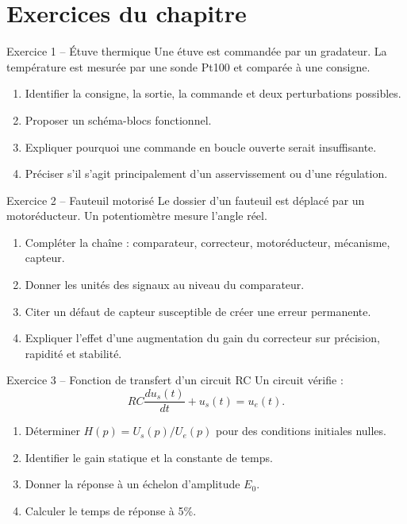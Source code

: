
\section{Exercices du chapitre}\label{sec:sa-exercices}

\begin{TLExercise}{Exercice 1 -- Étuve thermique}
Une étuve est commandée par un gradateur. La température est mesurée par une sonde Pt100 et comparée à une consigne.
\begin{enumerate}
  \item Identifier la consigne, la sortie, la commande et deux perturbations possibles.
  \item Proposer un schéma-blocs fonctionnel.
  \item Expliquer pourquoi une commande en boucle ouverte serait insuffisante.
  \item Préciser s'il s'agit principalement d'un asservissement ou d'une régulation.
\end{enumerate}
\end{TLExercise}

\begin{TLExercise}{Exercice 2 -- Fauteuil motorisé}
Le dossier d'un fauteuil est déplacé par un motoréducteur. Un potentiomètre mesure l'angle réel.
\begin{enumerate}
  \item Compléter la chaîne : comparateur, correcteur, motoréducteur, mécanisme, capteur.
  \item Donner les unités des signaux au niveau du comparateur.
  \item Citer un défaut de capteur susceptible de créer une erreur permanente.
  \item Expliquer l'effet d'une augmentation du gain du correcteur sur précision, rapidité et stabilité.
\end{enumerate}
\end{TLExercise}

\begin{TLExercise}{Exercice 3 -- Fonction de transfert d'un circuit RC}
Un circuit vérifie :
\[
RC\frac{du_s(t)}{dt}+u_s(t)=u_e(t).
\]
\begin{enumerate}
  \item Déterminer $H(p)=U_s(p)/U_e(p)$ pour des conditions initiales nulles.
  \item Identifier le gain statique et la constante de temps.
  \item Donner la réponse à un échelon d'amplitude $E_0$.
  \item Calculer le temps de réponse à 5\%.
\end{enumerate}
\end{TLExercise}

